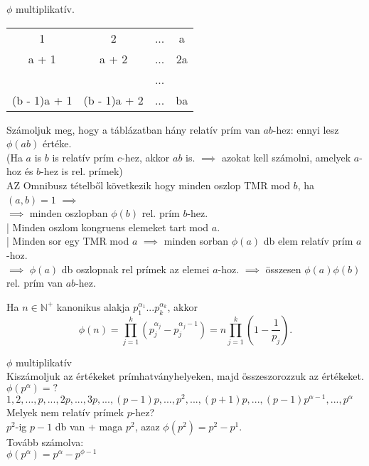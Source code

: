 \begin{frame}
\begin{tcolorbox}[title={Tétel: $\phi$ multiplikativitása}]
$\phi$ multiplikatív.
\end{tcolorbox}

\begin{tcolorbox}[title={Bizonyítás}]
\smallskip
\begin{tabular}{c c c c}
1 & 2 & ... & a \\
a + 1 & a + 2 & ... & 2a\\
 &  & ... &  \\
(b - 1)a + 1 & (b - 1)a + 2 & ... & ba
\end{tabular}
\smallskip
Számoljuk meg, hogy a táblázatban hány relatív prím van $ab$-hez: ennyi lesz ${\phi}(ab)$ értéke.\\
(Ha $a$ is $b$ is relatív prím $c$-hez, akkor $ab$ is. $\implies$ azokat kell számolni, amelyek $a$-hoz és $b$-hez is rel. prímek)\\
\smallskip
AZ Omnibusz tételből következik hogy minden oszlop TMR mod $b$, ha $(a, b) = 1$ $\implies$\\
$\implies$ minden oszlopban ${\phi}(b)$ rel. prím $b$-hez.\\
\smallskip
| Minden oszlom kongruens elemeket tart mod $a$.\\
| Minden sor egy TMR mod $a$ $\implies$ minden sorban ${\phi}(a)$ db elem relatív prím $a$-hoz.\\
$\implies$ ${\phi}(a)$ db oszlopnak rel prímek az elemei $a$-hoz. $\implies$ összesen ${\phi}(a){\phi}(b)$ rel. prím van $ab$-hez.
\end{tcolorbox}
\end{frame}

\begin{frame}
\begin{tcolorbox}[title={Tétel: ${\phi}$(n) kiszámolása}]
Ha $n \in \mathbb{N}^+$ kanonikus alakja $p_1^{{\alpha}_1}...p_k^{{\alpha}_k}$, akkor\\
$${\phi}(n) = \prod^k_{j=1} (p_j^{{\alpha}_j} - p_j^{{\alpha}_j - 1}) = n \prod^k_{j=1} (1 - \frac{1}{p_j}).$$
\end{tcolorbox}

\begin{tcolorbox}[title={Bizonyítás}]
$\phi$ multiplikatív\\
Kiszámoljuk az értékeket prímhatványhelyeken, majd összeszorozzuk az értékeket.\\
${\phi}(p^{\alpha}) = ?$\\
$1, 2, ..., p, ..., 2p, ..., 3p, ..., (p-1)p, ..., p^2, ..., (p+1)p, ..., (p-1)p^{{\alpha}-1}, ..., p^{\alpha}$\\
Melyek nem relatív prímek $p$-hez?\\
\smallskip
$p^2$-ig $p - 1$ db van + maga $p^2$, azaz ${\phi}(p^2) = p^2 - p^1$.\\
Tovább számolva:\\
${\phi}(p^{\alpha}) = p^{\alpha} - p^{\phi - 1}$
\end{tcolorbox}
\end{frame}

